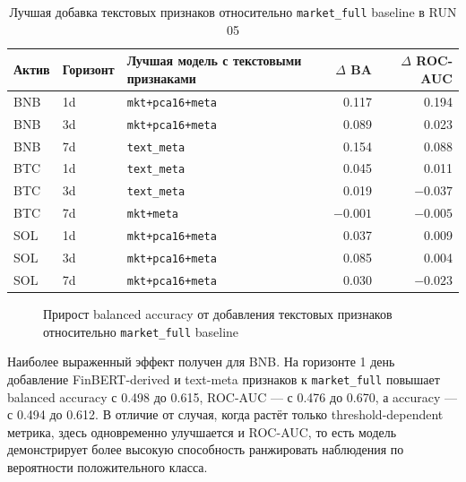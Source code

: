 \begin{table}[htbp]
\centering
\small
\begin{tabular}{llp{4.8cm}rr}
\toprule
Актив & Горизонт & Лучшая модель с текстовыми признаками & $\Delta$ BA & $\Delta$ ROC-AUC \\
\midrule
BNB & 1d & \texttt{mkt+pca16+meta} & 0.117 & 0.194 \\
BNB & 3d & \texttt{mkt+pca16+meta} & 0.089 & 0.023 \\
BNB & 7d & \texttt{text\_meta} & 0.154 & 0.088 \\
BTC & 1d & \texttt{text\_meta} & 0.045 & 0.011 \\
BTC & 3d & \texttt{text\_meta} & 0.019 & $-0.037$ \\
BTC & 7d & \texttt{mkt+meta} & $-0.001$ & $-0.005$ \\
SOL & 1d & \texttt{mkt+pca16+meta} & 0.037 & 0.009 \\
SOL & 3d & \texttt{mkt+pca16+meta} & 0.085 & 0.004 \\
SOL & 7d & \texttt{mkt+pca16+meta} & 0.030 & $-0.023$ \\
\bottomrule
\end{tabular}
\caption{Лучшая добавка текстовых признаков относительно \texttt{market\_full} baseline в RUN 05}
\label{tab:run05_best_text_delta}
\end{table}

\begin{figure}[htbp]
\centering
{}
\caption{Прирост balanced accuracy от добавления текстовых признаков относительно \texttt{market\_full} baseline}
\label{fig:run05_delta_balanced_accuracy}
\end{figure}

Наиболее выраженный эффект получен для BNB. На горизонте 1 день добавление FinBERT-derived и text-meta признаков к \texttt{market\_full} повышает balanced accuracy с 0.498 до 0.615, ROC-AUC --- с 0.476 до 0.670, а accuracy --- с 0.494 до 0.612. В отличие от случая, когда растёт только threshold-dependent метрика, здесь одновременно улучшается и ROC-AUC, то есть модель демонстрирует более высокую способность ранжировать наблюдения по вероятности положительного класса.

